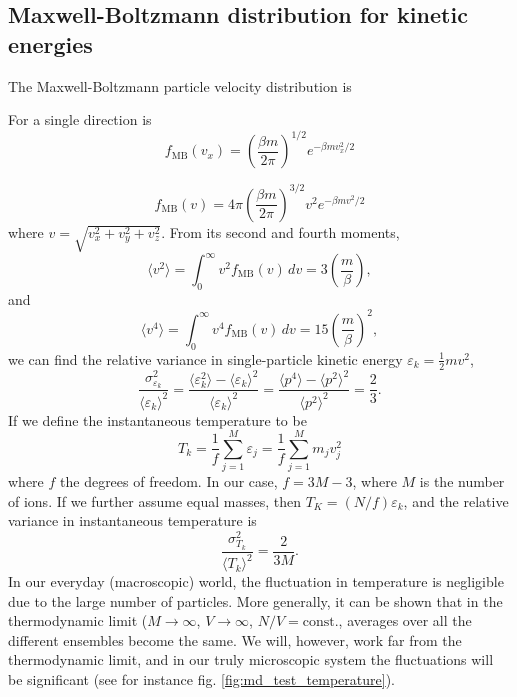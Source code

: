 \documentclass[11pt]{scrbook}   %
\begin{document}
\subsection{Maxwell-Boltzmann distribution for kinetic energies}


The Maxwell-Boltzmann particle velocity distribution is

For a single direction is
\begin{equation}
  f_{\text{MB}}(v_x) = \left(\frac{\beta m}{2\pi }\right)^{1/2} e^{-\beta m v_x^2 / 2}
  \label{eq:maxboltz-vdist-1D}
\end{equation}

\begin{equation}
  f_{\text{MB}}(v) = 4\pi\left(\frac{\beta m}{2\pi }\right)^{3/2} v^2 e^{-\beta m v^2 / 2}
  \label{eq:maxboltz-vdist}
\end{equation}
where $v=\sqrt{v_x^2+v_y^2+v_z^2}$.
From its second and fourth moments,
\begin{equation}
  \langle v^2 \rangle = \int_0^{\infty} v^2 f_{\text{MB}}(v) \,dv = 3\left(\frac{m}{\beta}\right),
\end{equation}
and
\begin{equation}
  \langle v^4 \rangle = \int_0^{\infty} v^4 f_{\text{MB}}(v) \,dv = 15\left(\frac{m}{\beta}\right)^2,
\end{equation}
we can find the relative variance in single-particle kinetic energy $\varepsilon_k = \frac12 m v^2$,
\begin{equation}
  \frac{\sigma_{\varepsilon_k}^2}{\langle \varepsilon_k \rangle^2} 
  = \frac{\langle \varepsilon_k^2 \rangle - \langle \varepsilon_k \rangle^2}{ \langle \varepsilon_k \rangle^2 }
  = \frac{\langle p^4 \rangle - \langle p^2 \rangle^2}{ \langle p^2 \rangle^2 }
  = \frac{2}{3}.
\end{equation}
If we define the instantaneous temperature to be
\begin{equation}
  T_k = \frac{1}{f} \sum_{j=1}^M \varepsilon_j = \frac{1}{f}\sum_{j=1}^M m_j v_j^2
  \label{eq:kinetictemp}
\end{equation}
where $f$ the degrees of freedom.
In our case, $f=3M-3$, where $M$  is the number of ions.
If we further assume equal masses, then $T_K = (N/f) \varepsilon_k$, and the relative variance in instantaneous temperature is
\begin{equation}
  \frac{\sigma_{T_k}^2}{\langle T_k \rangle^2} = \frac{2}{3M}.
  \label{eq:tempvar}
\end{equation}
In our everyday (macroscopic) world, the fluctuation in temperature is negligible due to the large number of particles. 
More generally, it can be shown that in the thermodynamic limit ($M\to\infty$, $V\to\infty$, $N/V=\text{const.}$, 
averages over all the different ensembles become the same. We will, however, work far from the thermodynamic limit, 
and in our truly microscopic system the fluctuations will be significant (see for instance fig. \ref{fig:md_test_temperature}).
\end{document}
